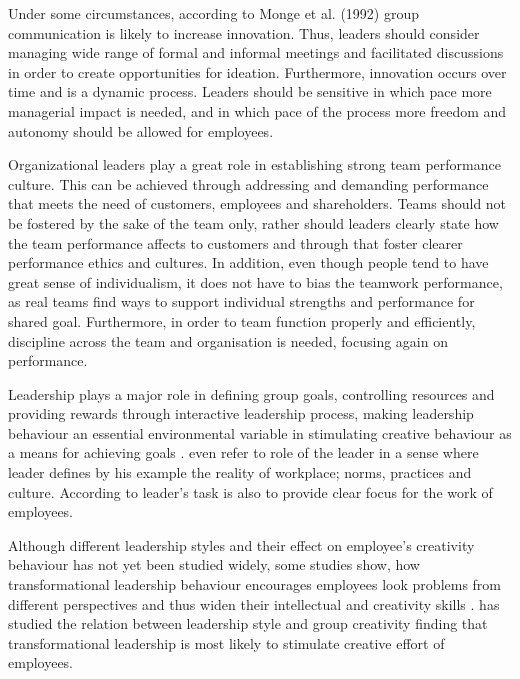 Under some circumstances, according to Monge et al. (1992) \citet{monge1992communication} group communication is likely to increase innovation. Thus, leaders should consider managing wide range of formal and informal meetings and facilitated discussions in order to create opportunities for ideation. Furthermore, innovation occurs over time and is a dynamic process. Leaders should be sensitive in which pace more managerial impact is needed, and in which pace of the process more freedom and autonomy should be allowed for employees. \citep{monge1992communication} 

Organizational leaders play a great role in establishing strong team performance culture. This can be achieved through addressing and demanding performance that meets the need of customers, employees and shareholders. Teams should not be fostered by the sake of the team only, rather should leaders clearly state how the team performance affects to customers and through that foster clearer performance ethics and cultures. In addition, even though people tend to have great sense of individualism, it does not have to bias the teamwork performance, as real teams find ways to support individual strengths and performance for shared goal. Furthermore, in order to team function properly and efficiently, discipline across the team and organisation is needed, focusing again on performance.  \citep{katzenbach1993wisdom}
 
Leadership plays a major role in defining group goals, controlling resources and providing rewards through interactive leadership process, making leadership behaviour an essential environmental variable in stimulating creative behaviour as a means for achieving goals \citep{redmond1993putting}. \citet{katz1978social} even refer to role of the leader in a sense where leader defines by his example the reality of workplace; norms, practices and culture. According to \citet{barczak1989leadership} leader's task is also to provide clear focus for the work of employees. 

Although different leadership styles and their effect on employee's creativity behaviour has not yet been studied widely, some studies show, how transformational leadership behaviour encourages employees look problems from different perspectives and thus widen their intellectual and creativity skills \citep{jung2001transformational,sosik1998transformational}. \citet{jung2001transformational} has studied the relation between leadership style and group creativity finding that transformational leadership is most likely to stimulate creative effort of employees. 
 
